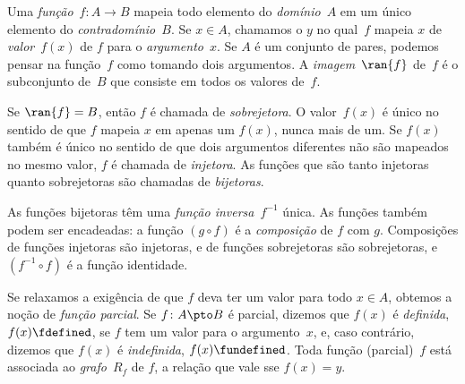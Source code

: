 Uma \emph{função}~$f\colon A \to B$ mapeia todo elemento do
\emph{domínio}~$A$ em um único elemento do \emph{contradomínio}~$B$. Se
$x \in A$, chamamos o $y$ no qual~$f$ mapeia $x$ de
\emph{valor}~$f(x)$ de $f$ para o \emph{argumento}~$x$. Se $A$ é um conjunto de
pares, podemos pensar na função~$f$ como tomando dois argumentos. A
\emph{imagem}~$\ran{f}$ de~$f$ é o subconjunto de~$B$ que consiste em
todos os valores de~$f$.

Se $\ran{f} = B$, então $f$ é chamada de \emph{sobrejetora}. O valor~$f(x)$
é único no sentido de que $f$ mapeia $x$ em apenas um $f(x)$, nunca mais de um.
Se $f(x)$ também é único no sentido de que dois argumentos diferentes não
são mapeados no mesmo valor, $f$ é chamada de \emph{injetora}. As funções
que são tanto injetoras quanto sobrejetoras são chamadas de \emph{bijetoras}.

As funções bijetoras têm uma \emph{função inversa}~$f^{-1}$ única.
As funções também podem ser encadeadas: a função $(g \circ f)$ é
a \emph{composição} de $f$ com $g$. Composições de funções
injetoras são injetoras, e de funções sobrejetoras são sobrejetoras,
e $(f^{-1} \circ f)$ é a função identidade.

Se relaxamos a exigência de que $f$ deva ter um valor para todo $x
\in A$, obtemos a noção de \emph{função parcial}. Se $f\colon
A \pto B$ é parcial, dizemos que $f(x)$ é \emph{definida},
$f(x) \fdefined$, se $f$ tem um valor para o argumento~$x$, e, caso contrário,
dizemos que $f(x)$ é \emph{indefinida}, $f(x) \fundefined$. Toda função
(parcial)~$f$ está associada ao \emph{grafo}~$R_f$ de $f$, a
relação que vale sse $f(x) = y$.
